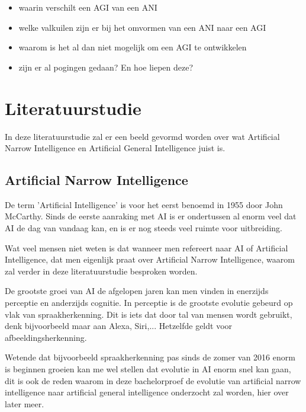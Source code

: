 \begin{itemize}
    \item waarin verschilt een AGI van een ANI
    \item welke valkuilen zijn er bij het omvormen van een ANI naar een AGI
    \item waarom is het al dan niet mogelijk om een AGI te ontwikkelen
    \item zijn er al pogingen gedaan? En hoe liepen deze?
\end{itemize}


\section{Literatuurstudie}
\label{sec:state-of-the-art}

In deze literatuurstudie zal er een beeld gevormd worden over wat Artificial Narrow Intelligence en Artificial General Intelligence juist is.

\subsection{Artificial Narrow Intelligence}

De term 'Artificial Intelligence' is voor het eerst benoemd in 1955 door John McCarthy. Sinds de eerste aanraking met AI is er ondertussen al enorm veel dat AI de dag van vandaag kan, en is er nog steeds veel ruimte voor uitbreiding.

Wat veel mensen niet weten is dat wanneer men refereert naar AI of Artificial Intelligence, dat men eigenlijk praat over Artificial Narrow Intelligence, waarom zal verder in deze literatuurstudie besproken worden. 

De grootste groei van AI de afgelopen jaren kan men vinden in enerzijds perceptie en anderzijds cognitie. In perceptie is de grootste evolutie gebeurd op vlak van spraakherkenning. Dit is iets dat door tal van mensen wordt gebruikt, denk bijvoorbeeld maar aan Alexa, Siri,... Hetzelfde geldt voor afbeeldingsherkenning.

Wetende dat bijvoorbeeld spraakherkenning pas sinds de zomer van 2016 enorm is beginnen groeien kan me wel stellen dat evolutie in AI enorm snel kan gaan, dit is ook de reden waarom in deze bachelorproef de evolutie van artificial narrow intelligence naar artificial general intelligence onderzocht zal worden, hier over later meer. \autocite{brynjolfsson2017artificial}

